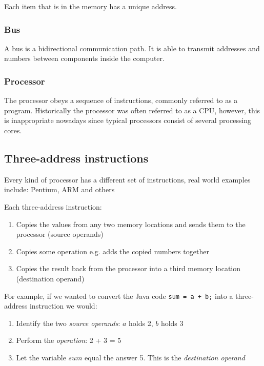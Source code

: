 Each item that is in the memory has a unique address.

\subsubsection{Bus}

A bus is a bidirectional communication path. It is able to transmit addresses
and numbers between components inside the computer.

\subsubsection{Processor}

The processor obeys a sequence of instructions, commonly referred to as a
program. Historically the processor was often referred to as a CPU, however,
this is inappropriate nowadays since typical processors consist of several
processing cores.

\subsection{Three-address instructions}

Every kind of processor has a different set of instructions, real world examples
include: Pentium, ARM and others

Each three-address instruction:
\begin{enumerate}
	\item Copies the values from any two memory locations and sends them to the processor (source operands)
	\item Copies some operation e.g. adds the copied numbers together
	\item Copies the result back from the processor into a third memory location (destination operand)
\end{enumerate}

For example, if we wanted to convert the Java code {\tt sum = a + b;} into a
three-address instruction we would:

\begin{enumerate}
	\item Identify the two {\it source operands}: $a$ holds 2, $b$ holds 3
	\item Perform the {\it operation}: 2 + 3 = 5
	\item Let the variable $sum$ equal the answer 5. This is the {\it destination operand}
\end{enumerate}

